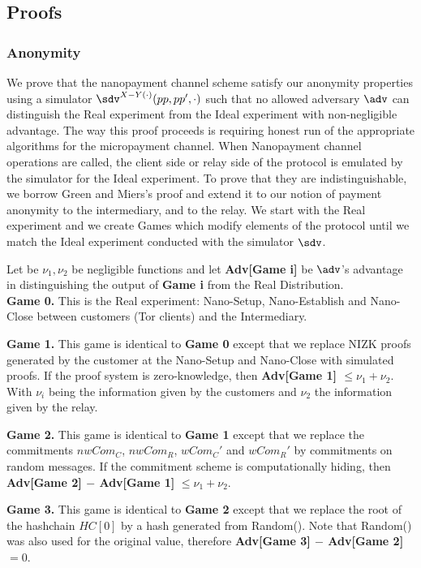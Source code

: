 \subsection{Proofs}

\subsubsection{Anonymity}

We prove that the nanopayment channel scheme satisfy our anonymity properties using a simulator $\sdv^{X-Y(\cdot)}(pp,pp',\cdot)$ such that no allowed adversary $\adv$ can distinguish the Real experiment from the Ideal experiment with non-negligible advantage. The way this proof proceeds is requiring honest run of the appropriate algorithms for the micropayment channel. When Nanopayment channel operations are called, the client side or relay side of the protocol is emulated by the simulator for the Ideal experiment. To prove that they are indistinguishable, we borrow Green and Miers's proof and extend it to our notion of payment anonymity to the intermediary, and to the relay. We start with the Real experiment and we create Games which modify elements of the protocol until we match the Ideal experiment conducted with the simulator $\sdv$.

Let be $\nu_1, \nu_2$ be negligible functions and let \textbf{Adv[Game i]} be $\adv$'s advantage in distinguishing the output of \textbf{Game i} from the Real Distribution. \\


\textbf{Game 0.} This is the Real experiment: Nano-Setup, Nano-Establish and Nano-Close between customers (Tor clients) and the Intermediary.

\textbf{Game 1.} This game is identical to \textbf{Game 0} except that we replace NIZK proofs generated by the customer at the Nano-Setup and Nano-Close with simulated proofs. If the proof system is zero-knowledge, then \textbf{Adv[Game 1] $\leq \nu_1 + \nu_2$}. With $\nu_i$ being the information given by the customers and $\nu_2$ the information given by the relay.

\textbf{Game 2.} This game is identical to \textbf{Game 1} except that we replace the commitments $nwCom_C$, $nwCom_R$, $wCom_C'$ and $wCom_R'$ by commitments on random messages. If the commitment scheme is computationally hiding, then \textbf{Adv[Game 2] $-$ Adv[Game 1]} $\leq \nu_1+\nu_2$.

\textbf{Game 3.} This game is identical to \textbf{Game 2} except that we replace  the root of the hashchain $HC[0]$ by a hash generated from Random(). Note that Random() was also used for the original value, therefore \textbf{Adv[Game 3] $-$ Adv[Game 2]} $= 0$.

